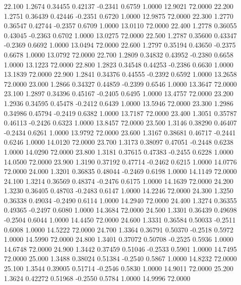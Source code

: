   22.100   1.2674   0.34455   0.42137  -0.2341   0.6759   1.0000  12.9021  72.0000
  22.200   1.2751   0.36439   0.42446  -0.2351   0.6720   1.0000  12.9875  72.0000
  22.300   1.2770   0.36547   0.42744  -0.2357   0.6709   1.0000  13.0110  72.0000
  22.400   1.2778   0.36055   0.43045  -0.2363   0.6702   1.0000  13.0275  72.0000
  22.500   1.2787   0.35600   0.43347  -0.2369   0.6692   1.0000  13.0494  72.0000
  22.600   1.2797   0.35194   0.43650  -0.2375   0.6678   1.0000  13.0792  72.0000
  22.700   1.2809   0.34832   0.43952  -0.2380   0.6658   1.0000  13.1223  72.0000
  22.800   1.2823   0.34548   0.44253  -0.2386   0.6630   1.0000  13.1839  72.0000
  22.900   1.2841   0.34376   0.44555  -0.2392   0.6592   1.0000  13.2658  72.0000
  23.000   1.2866   0.34327   0.44859  -0.2399   0.6546   1.0000  13.3647  72.0000
  23.100   1.2897   0.34396   0.45167  -0.2405   0.6495   1.0000  13.4757  72.0000
  23.200   1.2936   0.34595   0.45478  -0.2412   0.6439   1.0000  13.5946  72.0000
  23.300   1.2986   0.34986   0.45794  -0.2419   0.6382   1.0000  13.7187  72.0000
  23.400   1.3051   0.35787   0.46113  -0.2426   0.6323   1.0000  13.8457  72.0000
  23.500   1.3146   0.38290   0.46407  -0.2434   0.6261   1.0000  13.9792  72.0000
  23.600   1.3167   0.38681   0.46717  -0.2441   0.6246   1.0000  14.0120  72.0000
  23.700   1.3173   0.38097   0.47051  -0.2448   0.6238   1.0000  14.0290  72.0000
  23.800   1.3181   0.37615   0.47383  -0.2455   0.6228   1.0000  14.0500  72.0000
  23.900   1.3190   0.37192   0.47714  -0.2462   0.6215   1.0000  14.0776  72.0000
  24.000   1.3201   0.36835   0.48044  -0.2469   0.6198   1.0000  14.1149  72.0000
  24.100   1.3214   0.36569   0.48374  -0.2476   0.6175   1.0000  14.1639  72.0000
  24.200   1.3230   0.36405   0.48703  -0.2483   0.6147   1.0000  14.2246  72.0000
  24.300   1.3250   0.36338   0.49034  -0.2490   0.6114   1.0000  14.2940  72.0000
  24.400   1.3274   0.36355   0.49365  -0.2497   0.6080   1.0000  14.3684  72.0000
  24.500   1.3301   0.36439   0.49698  -0.2504   0.6044   1.0000  14.4450  72.0000
  24.600   1.3331   0.36584   0.50033  -0.2511   0.6008   1.0000  14.5222  72.0000
  24.700   1.3364   0.36791   0.50370  -0.2518   0.5972   1.0000  14.5990  72.0000
  24.800   1.3401   0.37072   0.50708  -0.2525   0.5936   1.0000  14.6748  72.0000
  24.900   1.3442   0.37459   0.51046  -0.2533   0.5901   1.0000  14.7495  72.0000
  25.000   1.3488   0.38024   0.51384  -0.2540   0.5867   1.0000  14.8232  72.0000
  25.100   1.3544   0.39005   0.51714  -0.2546   0.5830   1.0000  14.9011  72.0000
  25.200   1.3624   0.42272   0.51968  -0.2550   0.5784   1.0000  14.9996  72.0000
